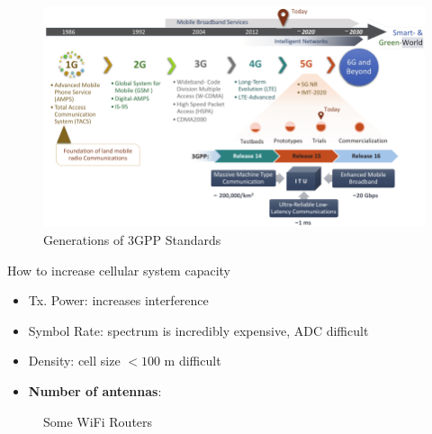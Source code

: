 \documentclass[xcolor=dvipsnames,aspectratio=169]{beamer}
\begin{document}
{\begin{figure}
 \centering
 \caption{Generations of 3GPP Standards}
 \includegraphics[width=.8\columnwidth]{generations}
\end{figure}
\framebreak
How to increase cellular system capacity
\begin{itemize}
 \item Tx. Power: increases interference
 \item Symbol Rate: spectrum is incredibly expensive, ADC difficult
 \item Density: cell size $<100$ m difficult
 \item \textbf{Number of antennas}:
\end{itemize}
\begin{figure}
 \centering
 \hspace{.1in}
 \hspace{.1in}
 \hspace{.1in}
 \caption{Some WiFi Routers}
\end{figure}
}
\end{document}

